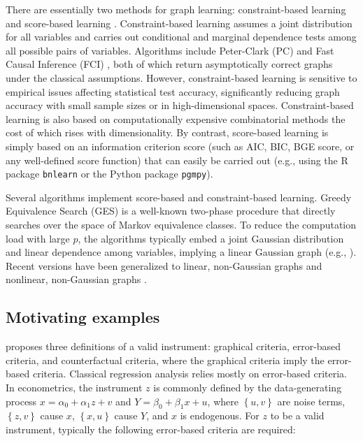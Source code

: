 \documentclass[11pt,review,authoryear]{elsarticle}
\begin{document}
There are essentially two methods for graph learning: constraint-based learning and score-based learning \citep{scutari2014bayesian}. Constraint-based learning assumes a joint distribution for all variables and carries out conditional and marginal dependence tests among all possible pairs of variables. Algorithms include Peter-Clark (PC) and Fast Causal Inference (FCI) \citep{spirtes2000constructing}, both of which return asymptotically correct graphs under the classical assumptions. However, constraint-based learning is sensitive to empirical issues affecting statistical test accuracy, significantly reducing graph accuracy with small sample sizes or in high-dimensional spaces. Constraint-based learning is also based on computationally expensive combinatorial methods the cost of which rises with dimensionality. By contrast, score-based learning is simply based on an information criterion score (such as AIC, BIC, BGE score, or any well-defined score function) that can easily be carried out (e.g., using the \textsf{R} package \texttt{bnlearn} or the \textsf{Python} package \texttt{pgmpy}).

Several algorithms implement score-based and constraint-based learning. Greedy Equivalence Search (GES) \citep{chickering2002optimal} is a well-known two-phase procedure that directly searches over the space of Markov equivalence classes. To reduce the computation load with large $p$, the algorithms typically embed a joint Gaussian distribution and linear dependence among variables, implying a linear Gaussian graph (e.g., \citet{bollen1989structural, geiger1994learning, spirtes2000causation}). Recent versions have been generalized to linear, non-Gaussian graphs \citep{shimizu2006linear} and nonlinear, non-Gaussian graphs \citep{hoyer2008nonlinear}.

\subsection*{Motivating examples}

\citet[246]{pearl2009causality} proposes three definitions of a valid instrument: graphical criteria, error-based criteria, and counterfactual criteria, where the graphical criteria imply the error-based criteria. Classical regression analysis relies mostly on error-based criteria. In econometrics, the instrument $z$ is commonly defined by the data-generating process $x = \alpha_0 + \alpha_1 z + v$ and $Y = \beta_0  + \beta_1 x + u$, where $\left\{ u, v \right\}$ are noise terms, $\left\{ z, v \right\}$ cause $x$, $\left\{ x, u \right\}$ cause $Y$, and $x$ is endogenous. For $z$ to be a valid instrument, typically the following error-based criteria are required:
\end{document}
